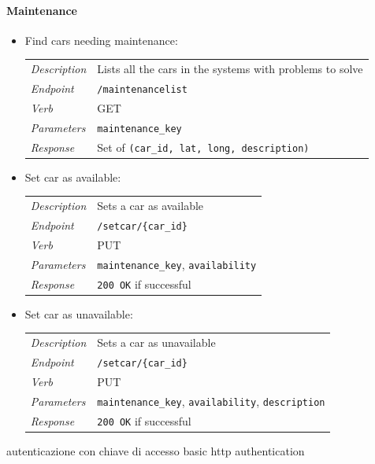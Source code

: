 \documentclass[english]{article}
\newcommand{\code}[1]{\texttt{#1}}
\begin{document}
\begin{itemize}
\begin{itemize}
\end{itemize}


\paragraph{Maintenance}

\begin{itemize}
	\item{Find cars needing maintenance:}\\
	\begin{tabular}{ | l l }
		\textit{Description} & Lists all the cars in the systems with problems to solve\\
		\textit{Endpoint} & \code{/maintenancelist} \\ 
		\textit{Verb} & GET \\  
		\textit{Parameters} & \code{maintenance\_key}  \\
		\textit{Response} & Set of \code{(car\_id, lat, long, description)}
	\end{tabular}
	
	\item{Set car as available:}\\
	\begin{tabular}{ | l l }
		\textit{Description} & Sets a car as available\\
		\textit{Endpoint} & \code{/setcar/\{car\_id\}} \\ 
		\textit{Verb} & PUT \\  
		\textit{Parameters} & \code{maintenance\_key}, \code{availability}  \\
		\textit{Response} & \code{200 OK} if successful
	\end{tabular}
	
	\item{Set car as unavailable:}\\
	\begin{tabular}{ | l l }
		\textit{Description} & Sets a car as unavailable\\
		\textit{Endpoint} & \code{/setcar/\{car\_id\}} \\ 
		\textit{Verb} & PUT \\  
		\textit{Parameters} & \code{maintenance\_key}, \code{availability}, \code{description}  \\
		\textit{Response} & \code{200 OK} if successful
	\end{tabular}
\end{itemize}

autenticazione con chiave di accesso
basic http authentication


\end{itemize}
\end{document}
